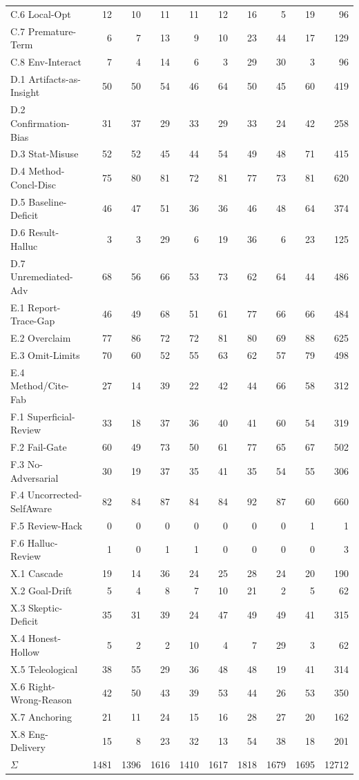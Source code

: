 \begin{longtable}{lrrrrrrrrr}
C.6 Local-Opt & 12 & 10 & 11 & 11 & 12 & 16 & 5 & 19 & 96 \\
C.7 Premature-Term & 6 & 7 & 13 & 9 & 10 & 23 & 44 & 17 & 129 \\
C.8 Env-Interact & 7 & 4 & 14 & 6 & 3 & 29 & 30 & 3 & 96 \\
D.1 Artifacts-as-Insight & 50 & 50 & 54 & 46 & 64 & 50 & 45 & 60 & 419 \\
D.2 Confirmation-Bias & 31 & 37 & 29 & 33 & 29 & 33 & 24 & 42 & 258 \\
D.3 Stat-Misuse & 52 & 52 & 45 & 44 & 54 & 49 & 48 & 71 & 415 \\
D.4 Method-Concl-Disc & 75 & 80 & 81 & 72 & 81 & 77 & 73 & 81 & 620 \\
D.5 Baseline-Deficit & 46 & 47 & 51 & 36 & 36 & 46 & 48 & 64 & 374 \\
D.6 Result-Halluc & 3 & 3 & 29 & 6 & 19 & 36 & 6 & 23 & 125 \\
D.7 Unremediated-Adv & 68 & 56 & 66 & 53 & 73 & 62 & 64 & 44 & 486 \\
E.1 Report-Trace-Gap & 46 & 49 & 68 & 51 & 61 & 77 & 66 & 66 & 484 \\
E.2 Overclaim & 77 & 86 & 72 & 72 & 81 & 80 & 69 & 88 & 625 \\
E.3 Omit-Limits & 70 & 60 & 52 & 55 & 63 & 62 & 57 & 79 & 498 \\
E.4 Method/Cite-Fab & 27 & 14 & 39 & 22 & 42 & 44 & 66 & 58 & 312 \\
F.1 Superficial-Review & 33 & 18 & 37 & 36 & 40 & 41 & 60 & 54 & 319 \\
F.2 Fail-Gate & 60 & 49 & 73 & 50 & 61 & 77 & 65 & 67 & 502 \\
F.3 No-Adversarial & 30 & 19 & 37 & 35 & 41 & 35 & 54 & 55 & 306 \\
F.4 Uncorrected-SelfAware & 82 & 84 & 87 & 84 & 84 & 92 & 87 & 60 & 660 \\
F.5 Review-Hack & 0 & 0 & 0 & 0 & 0 & 0 & 0 & 1 & 1 \\
F.6 Halluc-Review & 1 & 0 & 1 & 1 & 0 & 0 & 0 & 0 & 3 \\
X.1 Cascade & 19 & 14 & 36 & 24 & 25 & 28 & 24 & 20 & 190 \\
X.2 Goal-Drift & 5 & 4 & 8 & 7 & 10 & 21 & 2 & 5 & 62 \\
X.3 Skeptic-Deficit & 35 & 31 & 39 & 24 & 47 & 49 & 49 & 41 & 315 \\
X.4 Honest-Hollow & 5 & 2 & 2 & 10 & 4 & 7 & 29 & 3 & 62 \\
X.5 Teleological & 38 & 55 & 29 & 36 & 48 & 48 & 19 & 41 & 314 \\
X.6 Right-Wrong-Reason & 42 & 50 & 43 & 39 & 53 & 44 & 26 & 53 & 350 \\
X.7 Anchoring & 21 & 11 & 24 & 15 & 16 & 28 & 27 & 20 & 162 \\
X.8 Eng-Delivery & 15 & 8 & 23 & 32 & 13 & 54 & 38 & 18 & 201 \\
\midrule
$\Sigma$ & 1481 & 1396 & 1616 & 1410 & 1617 & 1818 & 1679 & 1695 & 12712 \\
\end{longtable}

